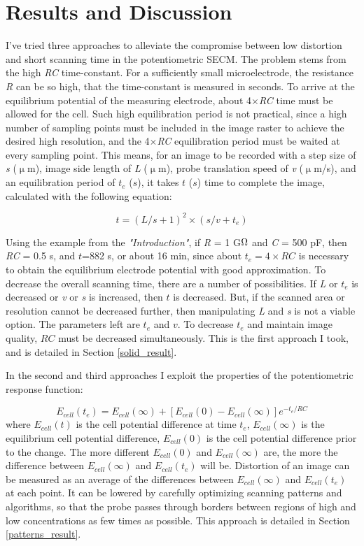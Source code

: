 \chapter{Results and Discussion}
I've tried three approaches to alleviate the compromise between low distortion and short scanning time in the potentiometric SECM.
The problem stems from the high \emph{RC} time-constant.
For a sufficiently small microelectrode, the resistance \emph{R} can be so high, that the time-constant is measured in seconds.
To arrive at the equilibrium potential of the measuring electrode, about 4$\times$\emph{RC} time must be allowed for the cell.
Such high equilibration period is not practical, since a high number of sampling points must be included in the image raster to achieve the desired high resolution, and the 4$\times$\emph{RC} equilibration period must be waited at every sampling point.
This means, for an image to be recorded with a step size of \emph{s} ($\upmu$m), image side length of \emph{L} ($\upmu$m), probe translation speed of \emph{v} ($\upmu$m/s), and an equilibration period of $t_e$ ($s$), it takes $t$ ($s$) time to complete the image, calculated with the following equation:

\begin{equation}
\label{eq:scantime}
	t = (L/s+1)^{2}\times(s/v + t_e)
\end{equation}

Using the example from the \emph{"Introduction"}, if \emph{R} = 1 G$\ohm$ and \emph{C} = 500 pF, then \emph{RC} = 0.5 s, and $t$=882 s, or about 16 min, since about $t_e = 4 \times RC$ is necessary to obtain the equilibrium electrode potential with good approximation.
To decrease the overall scanning time, there are a number of possibilities.
If \emph{L} or $t_e$ is decreased or \emph{v} or \emph{s} is increased, then $t$ is decreased.
But, if the scanned area or resolution cannot be decreased further, then manipulating \emph{L} and \emph{s} is not a viable option.
The parameters left are $t_e$ and $v$.
To decrease $t_e$ and maintain image quality, $RC$ must be decreased simultaneously.
This is the first approach I took, and is detailed in Section \ref{solid_result}.

In the second and third approaches I exploit the properties of the potentiometric response function:

\begin{equation}
\label{eq:rc}
        E_{cell}(t_{e}) = E_{cell}(\infty) + [E_{cell}(0) - E_{cell}(\infty)]e^{-t_{e}/RC}
\end{equation}
where $E_{cell}(t)$ is the cell potential difference at time $t_{e}$, $E_{cell}(\infty)$ is the equilibrium cell potential difference, $E_{cell}(0)$ is the cell potential difference prior to the change.
The more different $E_{cell}(0)$ and $E_{cell}(\infty)$ are, the more the difference between $E_{cell}(\infty)$ and $E_{cell}(t_{e})$ will be.
Distortion of an image can be measured as an average of the differences between $E_{cell}(\infty)$ and $E_{cell}(t_{e})$ at each point.
It can be lowered by carefully optimizing scanning patterns and algorithms, so that the probe passes through borders between regions of high and low concentrations as few times as possible.
This approach is detailed in Section \ref{patterns_result}.

